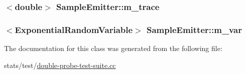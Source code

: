\subsubsection[{\texorpdfstring{m\+\_\+trace}{m_trace}}]{$<$double$>$ Sample\+Emitter\+::m\+\_\+trace\hspace{0.3cm}{\ttfamily [private]}}\hypertarget{classSampleEmitter_abe3b2910213805aae71482c827deea89}{}\label{classSampleEmitter_abe3b2910213805aae71482c827deea89}
\subsubsection[{\texorpdfstring{m\+\_\+var}{m_var}}]{$<${\bf Exponential\+Random\+Variable}$>$ Sample\+Emitter\+::m\+\_\+var\hspace{0.3cm}{\ttfamily [private]}}\hypertarget{classSampleEmitter_a8e709173254c25182aea2079cadcc72c}{}\label{classSampleEmitter_a8e709173254c25182aea2079cadcc72c}


The documentation for this class was generated from the following file\+:\begin{DoxyCompactItemize}
\item 
stats/test/\hyperlink{double-probe-test-suite_8cc}{double-\/probe-\/test-\/suite.\+cc}\end{DoxyCompactItemize}

